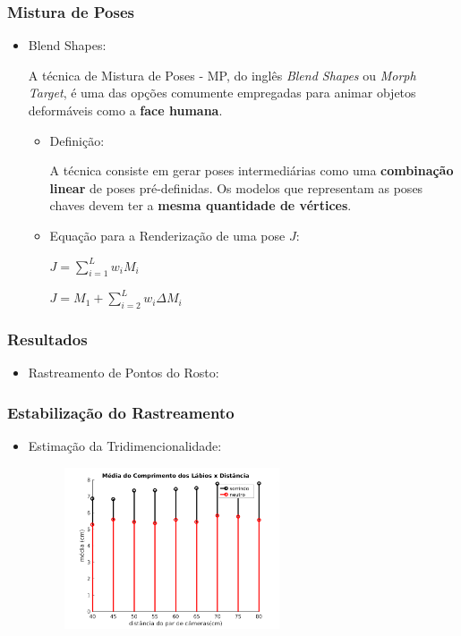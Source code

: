 \documentclass[brazil]{beamer}
\begin{document}
\begin{frame}
\frametitle{Mistura de Poses}
  \begin{itemize}
  	
  	\item Blend Shapes:
  	
  	A técnica de Mistura de Poses - MP, do inglês \textit{Blend Shapes} ou \textit{Morph Target}, é uma das opções comumente empregadas para animar objetos deformáveis como a \textbf{face humana}.
  	
 	 	\begin{itemize}
  	
 	 	\item Definição:
  	
 	 	A técnica consiste em gerar poses intermediárias como uma \textbf{combinação linear} de poses pré-definidas. Os modelos que representam as poses chaves devem ter a \textbf{mesma quantidade de vértices}.
  	
  	
  	    \item Equação para a Renderização de uma pose $J$:
      
   		   $J = \sum_{i=1}^L  w_i M_i$
      
   		   $J = M_1 + \sum_{i = 2}^L w_i \Delta M_i $

  \end{itemize} 

  \end{itemize} 
\end{frame}

\begin{frame}
\frametitle{Resultados}
  \begin{itemize}
      \item Rastreamento de Pontos do Rosto:
      
       
          
  \end{itemize} 
\end{frame}

\begin{frame}
\frametitle{Estabilização do Rastreamento}
  \begin{itemize}
      \item Estimação da Tridimencionalidade:
      \begin{figure}
        \centering
        \includegraphics[width = 0.6\textwidth, keepaspectratio]{./img/media_3d.png}
      \end{figure}
               
  \end{itemize} 
\end{frame}
\end{document}
